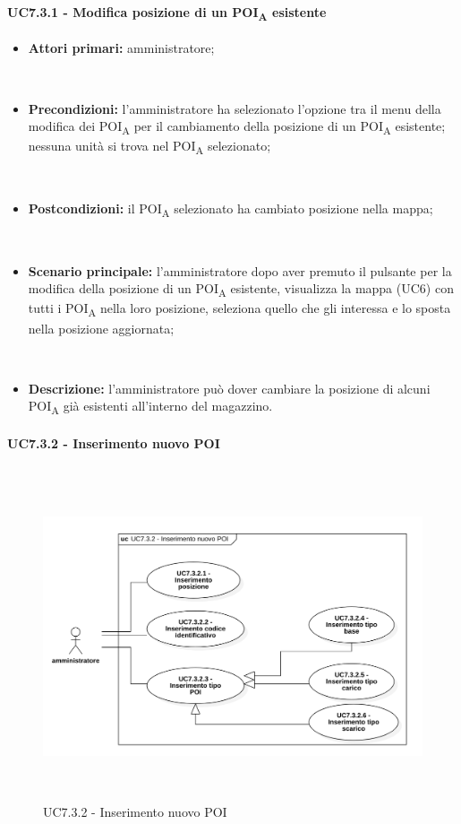 \paragraph{UC7.3.1 - Modifica posizione di un POI\textsubscript{A} esistente}



\begin{itemize}

​    \item   \textbf{Attori primari:} amministratore;

​    \item   \textbf{Precondizioni:} l'amministratore ha selezionato l'opzione tra il menu della modifica dei POI\textsubscript{A} per il cambiamento della posizione di un POI\textsubscript{A} esistente; nessuna unità si trova nel POI\textsubscript{A} selezionato;

​    \item   \textbf{Postcondizioni:} il POI\textsubscript{A} selezionato ha cambiato posizione nella mappa; 

​    \item   \textbf{Scenario principale:} l'amministratore dopo aver premuto il pulsante per la modifica della posizione di un POI\textsubscript{A} esistente, visualizza la mappa (UC6) con tutti i POI\textsubscript{A} nella loro posizione, seleziona quello che gli interessa e lo sposta nella posizione aggiornata;

​    \item   \textbf{Descrizione:} l'amministratore può dover cambiare la posizione di alcuni POI\textsubscript{A} già esistenti all'interno del magazzino.

\end{itemize}



\paragraph{UC7.3.2 - Inserimento nuovo POI}

\begin{figure}[H]

​    \centering

​    \includegraphics[scale=0.52]{res/images/uc7-3-2.png}

​    \caption{UC7.3.2 - Inserimento nuovo POI}

\end{figure}



